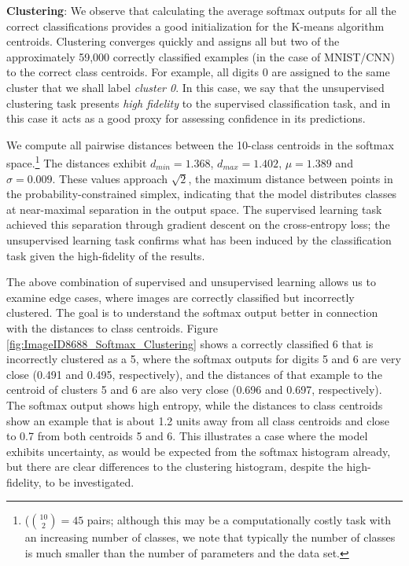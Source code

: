 \textbf{Clustering}: We observe that calculating the average softmax outputs for all the correct classifications provides a good initialization for the K-means algorithm centroids. Clustering converges quickly and assigns all but two of the approximately 59,000 correctly classified examples (in the case of MNIST/CNN) to the correct class centroids. For example, all digits 0 are assigned to the same cluster that we shall label \textit{cluster 0}. In this case, we say that the unsupervised clustering task presents \emph{high fidelity} to the supervised classification task, and in this case it acts as a good proxy for assessing confidence in its predictions.%

We compute all pairwise distances between the 10-class centroids in the softmax space.\footnote{($\binom{10}{2}=45$ pairs; although this may be a computationally costly task with an increasing number of classes, we note that typically the number of classes is much smaller than the number of parameters and the data set.} The distances exhibit $d_{min}=1.368$, $d_{max}=1.402$, $\mu=1.389$ and $\sigma=0.009$. These values approach $\sqrt{2}$, the maximum distance between points in the probability-constrained simplex, indicating that the model distributes classes at near-maximal separation in the output space. The supervised learning task achieved this separation through gradient descent on the cross-entropy loss; the unsupervised learning task confirms what has been induced by the classification task given the high-fidelity of the results.

The above combination of supervised and unsupervised learning allows us to examine edge cases, where images are correctly classified but incorrectly clustered. The goal is to understand the softmax output better in connection with the distances to class centroids. Figure \ref{fig:ImageID8688_Softmax_Clustering} shows a correctly classified 6 that is incorrectly clustered as a 5, where the softmax outputs for digits 5 and 6 are very close (0.491 and 0.495, respectively), and the distances of that example to the centroid of clusters 5 and 6 are also very close (0.696 and 0.697, respectively). %
The softmax output shows high entropy, while the distances to class centroids show an example that is about 1.2 units away from all class centroids and close to 0.7 from both centroids 5 and 6. This illustrates a case where the model exhibits uncertainty, as would be expected from the softmax histogram already, but there are clear differences to the clustering histogram, despite the high-fidelity, to be investigated.

